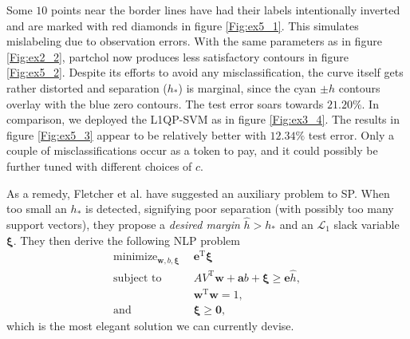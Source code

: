 \documentclass[11pt,a4paper]{article}
\theoremstyle{definition}
\renewcommand{\vec}[1]{\boldsymbol{#1}}
\begin{document}
      Some $10$ points near the border lines have had their labels intentionally inverted and are marked with red diamonds in figure \ref{Fig:ex5_1}. This simulates mislabeling due to observation errors. With the same parameters as in figure \ref{Fig:ex2_2}, \textsf{partchol} now produces less satisfactory contours in figure \ref{Fig:ex5_2}. Despite its efforts to avoid any misclassification, the curve itself gets rather distorted and separation ($h_{*}$) is marginal, since the cyan $\pm h$ contours overlay with the blue zero contours. The test error soars towards $21.20\%$. In comparison, we deployed the L1QP-SVM as in figure \ref{Fig:ex3_4}. The results in figure \ref{Fig:ex5_3} appear to be relatively better with $12.34\%$ test error. Only a couple of misclassifications occur as a token to pay, and it could possibly be further tuned with different choices of $c$.

      As a remedy, Fletcher et al. \cite{fletcher2010binary} have suggested an auxiliary problem to SP. When too small an $h_{*}$ is detected, signifying poor separation (with possibly too many support vectors), they propose a \textit{desired margin} $\hat{h}>h_{*}$ and an $\mathcal{L}_{1}$ slack variable $\vec{\xi}$. They then derive the following NLP problem
      \begin{align}
        \mathop{\text{minimize}}_{\vec{w},b,\vec{\xi}}~~ & \vec{e}^{\mathrm{T}}\vec{\xi} \label{Eqn:SPrelax1}\\
        \text{subject to}~~ & AV^{\mathrm{T}}\vec{w}+\vec{a}b+\vec{\xi}\geq\vec{e}\hat{h}, \label{Eqn:SPrelax2}\\
        & \vec{w}^{\mathrm{T}}\vec{w}=1, \label{Eqn:SPrelax3}\\
        \text{and}~~ & \vec{\xi}\geq\vec{0}, \label{Eqn:SPrelax4}
      \end{align}
      which is the most elegant solution we can currently devise.
\end{document}
